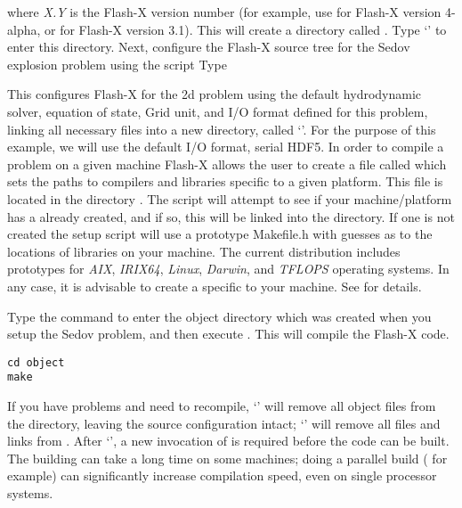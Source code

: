 \noindent where \emph{X.Y} is the Flash-X version number (for example,
use  for Flash-X version 4-alpha, or  for Flash-X version 3.1).  This will create a
directory called . Type `' to enter this directory. Next, configure the Flash-X
source tree for the Sedov explosion problem using the 
script%
Type \begin{quote}  \end{quote} This configures Flash-X for the 2d
problem using the default
hydrodynamic solver, equation of state, Grid unit, and I/O format
defined for this problem, linking all necessary files into a new
directory, called `'.  For the purpose of this example, we will
use the default I/O format, serial HDF5.  In order to compile a
problem on a given machine Flash-X allows the user to create a file
called
which sets the paths to compilers and libraries specific to a given
platform.  This file is located in the directory
.
The  script will
attempt to see if your machine/platform has a
already created, and if so, this will be linked into the
 directory.  If one is not created the setup script will use a 
prototype Makefile.h with guesses as to the locations of libraries on your
machine. The current distribution includes prototypes for \emph{AIX},
\emph{IRIX64}, \emph{Linux}, \emph{Darwin}, and \emph{TFLOPS} operating systems. In any
case, it is advisable to create a  specific to your
machine. See  
 for details.


Type the command  to enter the object directory which
was created  when you setup the Sedov problem, and then execute
. This will compile the Flash-X code. 
\begin{verbatim}
cd object
make
\end{verbatim}
If you have problems and need to recompile, `'%
will remove all object files from the  directory,
leaving the source configuration intact; `'%
will remove all files and links from .
After `', a new invocation of  is
required before the code can be built. The building can take a long
time on some machines; doing a parallel build ( for
example)%
can significantly
increase compilation speed, even on single processor systems.

